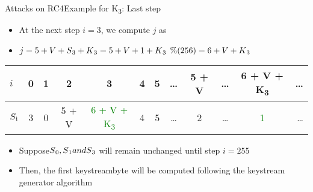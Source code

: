 \documentclass[
	aspectratio=169,	%
	onlytextwidth,		%
	t,					%
	]{beamer}
\begin{document}
\begin{frame}[fragile]{Attacks on RC4}{Example for K\textsubscript{3}: Last step}

	
	\begin{itemize}
		\item At the next step $i = 3$, we compute $j$ as
		\item $j = 5 + V + S\textsubscript{3} + K\textsubscript{3} = 5 + V + 1 + K\textsubscript{3}$ $\%(256) = 6 + V + K\textsubscript{3}$
	\end{itemize}
	
	\begin{table}[h!]
		\begin{center}
			\begin{tabular}{l|c|c|c|c|c|c|c|c|c|c|r}
			$i$ & 0 & 1 & 2 & 3 & 4 & 5 & \dots & 5 + V & \dots & 6 + V + K\textsubscript{3} & \dots\\
			\hline
			$S\textsubscript{i}$ & 3 & 0 & 5 + V & \textcolor{green}{6 + V + K\textsubscript{3}} & 4 & 5 & \dots & 2 & \dots & \textcolor{green}{1} & \dots\\
			\end{tabular}
		\end{center}
	\end{table}

	\begin{itemize}
		\item Suppose$ S\textsubscript{0}, S\textsubscript{1} and S\textsubscript{3}$ will remain unchanged until step $i = 255$
		\item Then, the first keystreambyte will be computed following the keystream generator algorithm
	\end{itemize}

\end{frame}
\end{document}
